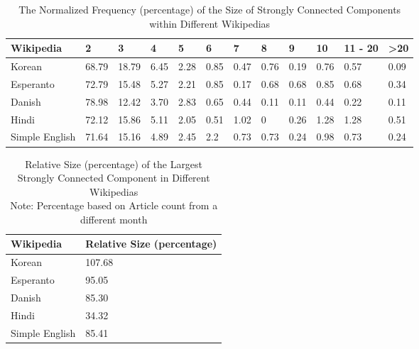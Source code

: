 \documentclass[twoside]{article}
\begin{document}
\begin{table}[h]

\caption{The Normalized Frequency (percentage) of the Size of Strongly Connected Components within Different Wikipedias}

\centering

\begin{tabular}{| l | l | l | l | l | l |  l | l | l | l | l | l | }

\hline

Wikipedia & 2 & 3 & 4 & 5 & 6 & 7 & 8 & 9 & 10 & {11 - 20} & >20 \\ \hline

Korean & 68.79 & 18.79 & 6.45 & 2.28 & 0.85 & 0.47 & 0.76 & 0.19 & 0.76 & 0.57 & 0.09 \\ \hline

Esperanto & 72.79 & 15.48 & 5.27 & 2.21 & 0.85 & 0.17 & 0.68 & 0.68 & 0.85 & 0.68 & 0.34 \\ \hline

Danish & 78.98 & 12.42 & 3.70 & 2.83 & 0.65 & 0.44 & 0.11 & 0.11 & 0.44 & 0.22 & 0.11 \\ \hline

Hindi & 72.12 & 15.86 & 5.11 & 2.05 & 0.51 & 1.02 & 0 & 0.26 & 1.28  & 1.28 & 0.51 \\ \hline

Simple English & 71.64  & 15.16 & 4.89 & 2.45 & 2.2 & 0.73 & 0.73 & 0.24 & 0.98 & 0.73 & 0.24 \\ \hline

\end{tabular}

\end{table}


\begin{table}[h]
\centering

\caption{Relative Size (percentage) of the Largest Strongly Connected Component in Different Wikipedias \\
	Note: Percentage based on Article count from a different month}

\begin{tabular}{| l | l |}

\hline

Wikipedia & Relative Size (percentage)   \\ \hline

Korean & 107.68 \\ \hline

Esperanto &  95.05  \\ \hline

Danish &  85.30 \\ \hline

Hindi & 34.32 \\ \hline

Simple English & 85.41  \\ \hline

\end{tabular}

\end{table}
\end{document}

